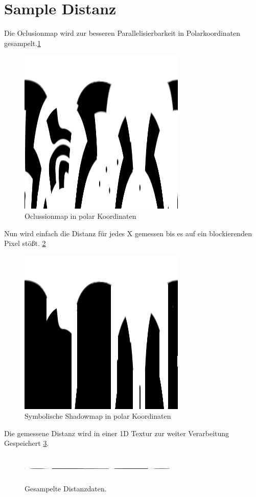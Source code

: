 \section{Sample Distanz}
Die Oclusionmap wird zur besseren Parallelisierbarkeit in Polarkoordinaten gesampelt.\ref{o_2}
\begin{figure}
	\centering
	\includegraphics{images/oclusion_polar_2.png}
	\caption{Oclussionmap in polar Koordinaten}
	\label{o_2}
\end{figure}
Nun wird einfach die Distanz für jedes X gemessen bis es auf ein blockierenden Pixel stößt. \ref{o_3}
\begin{figure}
	\centering
	\includegraphics{images/shadow_polar_2.png}
	\caption{Symbolische Shadowmap in polar Koordinaten}
	\label{o_3}
\end{figure}
Die gemessene Distanz wird in einer 1D Textur zur weiter Verarbeitung Gespeichert \ref{o_4}.
\begin{figure}
	\centering
	\includegraphics[width=0.7\textwidth,height=50px]{images/1DTexture.png}
	\caption{Gesampelte Distanzdaten.}
	\label{o_4}
\end{figure}
